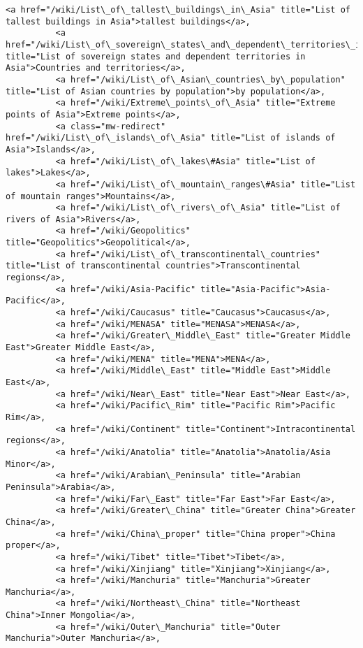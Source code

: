 \documentclass[11pt]{article}
\begin{document}
\begin{Verbatim}[commandchars=\\\{\}]
          <a href="/wiki/List\_of\_tallest\_buildings\_in\_Asia" title="List of tallest buildings in Asia">tallest buildings</a>,
          <a href="/wiki/List\_of\_sovereign\_states\_and\_dependent\_territories\_in\_Asia" title="List of sovereign states and dependent territories in Asia">Countries and territories</a>,
          <a href="/wiki/List\_of\_Asian\_countries\_by\_population" title="List of Asian countries by population">by population</a>,
          <a href="/wiki/Extreme\_points\_of\_Asia" title="Extreme points of Asia">Extreme points</a>,
          <a class="mw-redirect" href="/wiki/List\_of\_islands\_of\_Asia" title="List of islands of Asia">Islands</a>,
          <a href="/wiki/List\_of\_lakes\#Asia" title="List of lakes">Lakes</a>,
          <a href="/wiki/List\_of\_mountain\_ranges\#Asia" title="List of mountain ranges">Mountains</a>,
          <a href="/wiki/List\_of\_rivers\_of\_Asia" title="List of rivers of Asia">Rivers</a>,
          <a href="/wiki/Geopolitics" title="Geopolitics">Geopolitical</a>,
          <a href="/wiki/List\_of\_transcontinental\_countries" title="List of transcontinental countries">Transcontinental regions</a>,
          <a href="/wiki/Asia-Pacific" title="Asia-Pacific">Asia-Pacific</a>,
          <a href="/wiki/Caucasus" title="Caucasus">Caucasus</a>,
          <a href="/wiki/MENASA" title="MENASA">MENASA</a>,
          <a href="/wiki/Greater\_Middle\_East" title="Greater Middle East">Greater Middle East</a>,
          <a href="/wiki/MENA" title="MENA">MENA</a>,
          <a href="/wiki/Middle\_East" title="Middle East">Middle East</a>,
          <a href="/wiki/Near\_East" title="Near East">Near East</a>,
          <a href="/wiki/Pacific\_Rim" title="Pacific Rim">Pacific Rim</a>,
          <a href="/wiki/Continent" title="Continent">Intracontinental regions</a>,
          <a href="/wiki/Anatolia" title="Anatolia">Anatolia/Asia Minor</a>,
          <a href="/wiki/Arabian\_Peninsula" title="Arabian Peninsula">Arabia</a>,
          <a href="/wiki/Far\_East" title="Far East">Far East</a>,
          <a href="/wiki/Greater\_China" title="Greater China">Greater China</a>,
          <a href="/wiki/China\_proper" title="China proper">China proper</a>,
          <a href="/wiki/Tibet" title="Tibet">Tibet</a>,
          <a href="/wiki/Xinjiang" title="Xinjiang">Xinjiang</a>,
          <a href="/wiki/Manchuria" title="Manchuria">Greater Manchuria</a>,
          <a href="/wiki/Northeast\_China" title="Northeast China">Inner Mongolia</a>,
          <a href="/wiki/Outer\_Manchuria" title="Outer Manchuria">Outer Manchuria</a>,

\end{Verbatim}
\end{document}

